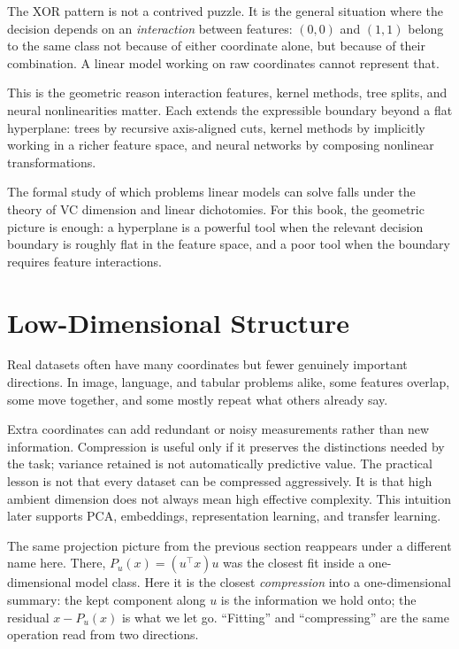 The XOR pattern is not a contrived puzzle. It is the general situation where the decision depends on an \emph{interaction} between features: $(0,0)$ and $(1,1)$ belong to the same class not because of either coordinate alone, but because of their combination. A linear model working on raw coordinates cannot represent that.

This is the geometric reason interaction features, kernel methods, tree splits, and neural nonlinearities matter. Each extends the expressible boundary beyond a flat hyperplane: trees by recursive axis-aligned cuts, kernel methods by implicitly working in a richer feature space, and neural networks by composing nonlinear transformations.

The formal study of which problems linear models can solve falls under the theory of VC dimension and linear dichotomies. For this book, the geometric picture is enough: a hyperplane is a powerful tool when the relevant decision boundary is roughly flat in the feature space, and a poor tool when the boundary requires feature interactions.

\section*{Low-Dimensional Structure}

Real datasets often have many coordinates but fewer genuinely important directions. In image, language, and tabular problems alike, some features overlap, some move together, and some mostly repeat what others already say.

Extra coordinates can add redundant or noisy measurements rather than new information. Compression is useful only if it preserves the distinctions needed by the task; variance retained is not automatically predictive value. The practical lesson is not that every dataset can be compressed aggressively. It is that high ambient dimension does not always mean high effective complexity. This intuition later supports PCA, embeddings, representation learning, and transfer learning.

The same projection picture from the previous section reappears under a different name here. There, $P_u(x) = (u^\top x)u$ was the closest fit inside a one-dimensional model class. Here it is the closest \emph{compression} into a one-dimensional summary: the kept component along $u$ is the information we hold onto; the residual $x - P_u(x)$ is what we let go. ``Fitting'' and ``compressing'' are the same operation read from two directions.

